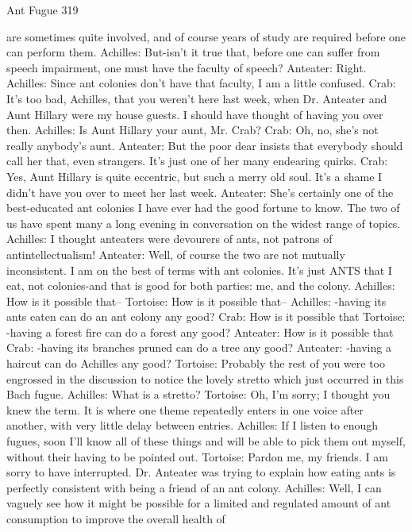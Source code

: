 Ant Fugue                                                                              319

    are sometimes quite involved, and of course years of study are required before one
    can perform them.
Achilles: But-isn't it true that, before one can suffer from speech impairment, one must
    have the faculty of speech?
Anteater: Right.
Achilles: Since ant colonies don't have that faculty, I am a little confused. Crab: It's too
    bad, Achilles, that you weren't here last week, when Dr.
Anteater and Aunt Hillary were my house guests. I should have thought of having you
    over then.
Achilles: Is Aunt Hillary your aunt, Mr. Crab? Crab: Oh, no, she's not really anybody's
    aunt.
Anteater: But the poor dear insists that everybody should call her that, even strangers. It's
    just one of her many endearing quirks.
Crab: Yes, Aunt Hillary is quite eccentric, but such a merry old soul. It's a shame I didn't
    have you over to meet her last week.
Anteater: She's certainly one of the best-educated ant colonies I have ever had the good
    fortune to know. The two of us have spent many a long evening in conversation on
    the widest range of topics.
Achilles: I thought anteaters were devourers of ants, not patrons of antintellectualism!
Anteater: Well, of course the two are not mutually inconsistent. I am on the best of terms
    with ant colonies. It's just ANTS that I eat, not colonies-and that is good for both
    parties: me, and the colony.
Achilles: How is it possible that--
Tortoise: How is it possible that--
Achilles: -having its ants eaten can do an ant colony any good? Crab: How is it possible
    that
Tortoise: -having a forest fire can do a forest any good? Anteater: How is it possible that
Crab: -having its branches pruned can do a tree any good? Anteater: -having a haircut can
    do Achilles any good?
Tortoise: Probably the rest of you were too engrossed in the discussion to notice the
    lovely stretto which just occurred in this Bach fugue.
Achilles: What is a stretto?
Tortoise: Oh, I'm sorry; I thought you knew the term. It is where one theme repeatedly
    enters in one voice after another, with very little delay between entries.
Achilles: If I listen to enough fugues, soon I'll know all of these things and will be able to
    pick them out myself, without their having to be pointed out.
Tortoise: Pardon me, my friends. I am sorry to have interrupted. Dr. Anteater was trying
    to explain how eating ants is perfectly consistent with being a friend of an ant colony.
Achilles: Well, I can vaguely see how it might be possible for a limited and regulated
    amount of ant consumption to improve the overall health of




